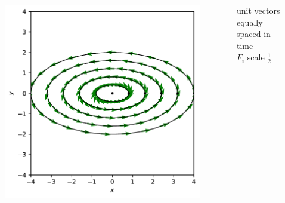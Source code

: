 \begin{columns}
\begin{column}{0.65\textwidth}
\vspace{-0.35in}
\begin{figure}
\includegraphics[scale=0.6]{../plots/ellipse_trajectory.pdf}
\end{figure}
\end{column}

\begin{column}{0.35\textwidth}
unit vectors \\
equally spaced in time \\
$F_i$ scale $\frac{1}{2}$
\end{column}
\end{columns}
